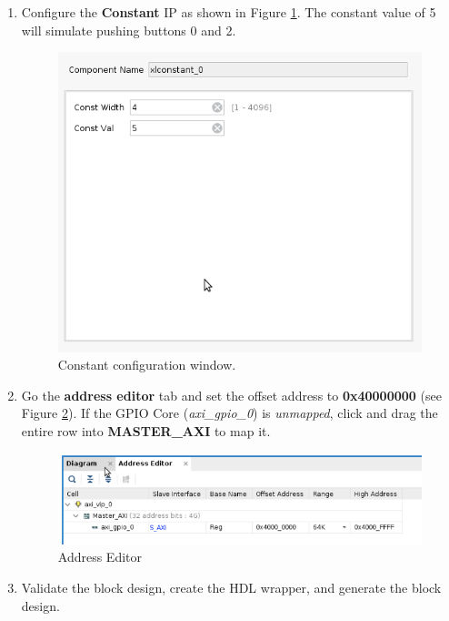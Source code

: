 \documentclass[11pt]{article}
\begin{document}
\begin{enumerate}
    \item Configure the \textbf{Constant} IP as shown in Figure \ref{fig:axiconstantconfig}. The constant value of 5 will simulate pushing buttons 0 and 2.
    
    \begin{figure}[H]
      \centering
      \includegraphics[scale=0.5]{axiconstantconfig.png}
      \caption{Constant configuration window.}
      \label{fig:axiconstantconfig}
    \end{figure}
    
    \item Go the \textbf{address editor} tab and set the offset address to \textbf{0x40000000} (see Figure \ref{fig:addresseditor}). If the GPIO Core (\textit{axi\_gpio\_0}) is \textit{unmapped}, click and drag the entire row into \textbf{MASTER\_AXI} to map it.
    
    \begin{figure}[H]
      \centering
      \includegraphics[scale=0.5]{addresseditor.png}
      \caption{Address Editor}
      \label{fig:addresseditor}
    \end{figure}
    
    \item Validate the block design, create the HDL wrapper, and generate the block design. 
    

\end{enumerate}
\end{document}
